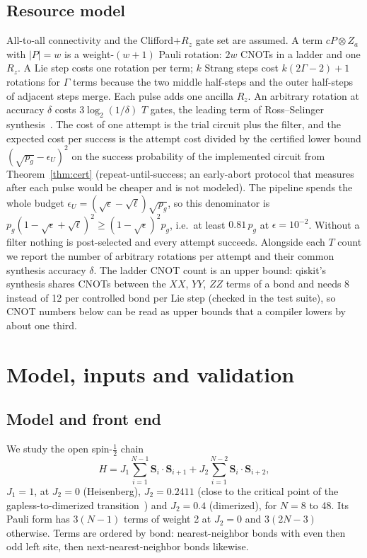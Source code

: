 \documentclass[aps,pra,twocolumn,superscriptaddress,nofootinbib]{revtex4-2}
\begin{document}
\subsection{Resource model}

All-to-all connectivity and the Clifford+$R_z$ gate set are assumed. A term $cP\otimes Z_a$ with
$|P|=w$ is a weight-$(w+1)$ Pauli rotation: $2w$ CNOTs in a ladder and one $R_z$. A Lie step costs one
rotation per term; $k$ Strang steps cost $k(2\Gamma-2)+1$ rotations for $\Gamma$ terms because the two
middle half-steps and the outer half-steps of adjacent steps merge. Each pulse adds one ancilla $R_z$.
An arbitrary rotation at accuracy $\delta$ costs $3\log_2(1/\delta)$ $T$ gates, the leading term of
Ross--Selinger synthesis~\cite{Ross2016}. The cost of one attempt is the trial circuit plus the
filter, and the expected cost per success is the attempt cost divided by the certified lower bound
$(\sqrt{p_g}-\epsilon_U)^2$ on the success probability of the implemented circuit from
Theorem~\ref{thm:cert} (repeat-until-success; an early-abort protocol that measures after each pulse
would be cheaper and is not modeled). The pipeline spends the whole budget
$\epsilon_U=(\sqrt\epsilon-\sqrt\ell)\sqrt{p_g}$, so this denominator is
$p_g(1-\sqrt\epsilon+\sqrt\ell)^2\ge(1-\sqrt\epsilon)^2p_g$, i.e.\ at least $0.81\,p_g$ at
$\epsilon=10^{-2}$. Without a filter nothing is post-selected and every attempt succeeds. Alongside
each $T$ count we report the number of arbitrary rotations per attempt and their common synthesis
accuracy $\delta$. The ladder CNOT count is an upper bound: qiskit's
synthesis shares CNOTs between the $XX$, $YY$, $ZZ$ terms of a bond and needs 8 instead of 12 per
controlled bond per Lie step (checked in the test suite), so CNOT numbers below can be read as upper
bounds that a compiler lowers by about one third.

\section{Model, inputs and validation}
\label{sec:application}

\subsection{Model and front end}

We study the open spin-$\frac12$ chain
\begin{equation}
H=J_1\sum_{i=1}^{N-1}\mathbf S_i\cdot\mathbf S_{i+1}+J_2\sum_{i=1}^{N-2}\mathbf S_i\cdot\mathbf S_{i+2},
\end{equation}
$J_1=1$, at $J_2=0$ (Heisenberg), $J_2=0.2411$ (close to the critical point of the
gapless-to-dimerized transition~\cite{Okamoto1992,Eggert1996}) and $J_2=0.4$ (dimerized), for $N=8$ to
48. Its Pauli form has $3(N-1)$ terms of weight 2 at $J_2=0$ and $3(2N-3)$ otherwise. Terms are ordered by bond: nearest-neighbor bonds
with even then odd left site, then next-nearest-neighbor bonds likewise.
\end{document}
